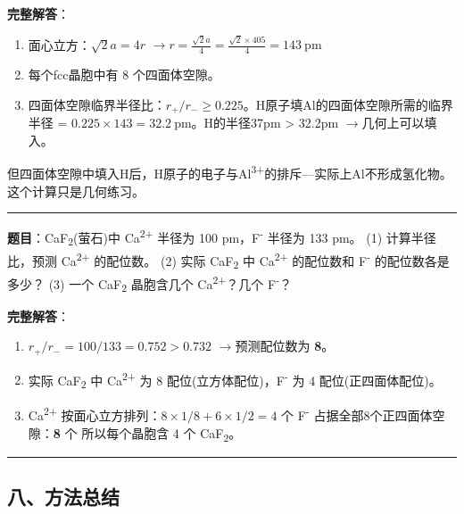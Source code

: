 \documentclass[a4paper,11pt]{ctexart}
\newcommand{\箭}{\ensuremath{\rightarrow}}
\newcommand{\左箭}{\ensuremath{\leftarrow}}
\newcommand{\上箭}{\ensuremath{\uparrow}}
\newcommand{\下箭}{\ensuremath{\downarrow}}
\newcommand{\衡}{\ensuremath{\rightleftharpoons}}
\newcommand{\双箭}{\ensuremath{\leftrightarrow}}
\newcommand{\约等于}{\ensuremath{\approx}}
\newcommand{\小于等于}{\ensuremath{\leq}}
\newcommand{\大于等于}{\ensuremath{\geq}}
\newcommand{\不等于}{\ensuremath{\neq}}
\newcommand{\西格马}{\ensuremath{\sigma}}
\newcommand{\派}{\ensuremath{\pi}}
\begin{document}
\textbf{完整解答}：

\begin{enumerate}
\def\labelenumi{(\arabic{enumi})}
\item
  面心立方：\(\sqrt{2}a = 4r\) \箭 \(r = \frac{\sqrt{2}a}{4} = \frac{\sqrt{2} \times 405}{4} = 143\ \mathrm{pm}\)
\item
  每个fcc晶胞中有 8 个四面体空隙。
\item
  四面体空隙临界半径比：\(r_+/r_- \geq 0.225\)。H原子填Al的四面体空隙所需的临界半径 = \(0.225 \times 143 = 32.2\ \mathrm{pm}\)。H的半径37pm \textgreater{} 32.2pm \箭 几何上可以填入。
\end{enumerate}

但四面体空隙中填入H后，H原子的电子与Al\textsuperscript{3+}的排斥---实际上Al不形成氢化物。这个计算只是几何练习。

\begin{center}\rule{0.5\linewidth}{0.5pt}\end{center}

\textbf{题目}：CaF\textsubscript{2}(萤石)中 Ca\textsuperscript{2+} 半径为 100 pm，F\textsuperscript{-} 半径为 133 pm。
(1) 计算半径比，预测 Ca\textsuperscript{2+} 的配位数。
(2) 实际 CaF\textsubscript{2} 中 Ca\textsuperscript{2+} 的配位数和 F\textsuperscript{-} 的配位数各是多少？
(3) 一个 CaF\textsubscript{2} 晶胞含几个 Ca\textsuperscript{2+}？几个 F\textsuperscript{-}？

\textbf{完整解答}：

\begin{enumerate}
\def\labelenumi{(\arabic{enumi})}
\item
  \(r_+/r_- = 100/133 = 0.752 > 0.732\) \箭 预测配位数为 \textbf{8}。
\item
  实际 CaF\textsubscript{2} 中 Ca\textsuperscript{2+} 为 8 配位(立方体配位)，F\textsuperscript{-} 为 4 配位(正四面体配位)。
\item
  Ca\textsuperscript{2+} 按面心立方排列：\(8 \times 1/8 + 6 \times 1/2 = 4\) 个
  F\textsuperscript{-} 占据全部8个正四面体空隙：\textbf{8} 个
  所以每个晶胞含 4 个 CaF\textsubscript{2}。
\end{enumerate}

\begin{center}\rule{0.5\linewidth}{0.5pt}\end{center}

\subsection{八、方法总结}\label{ux516bux65b9ux6cd5ux603bux7ed3}
\end{document}
